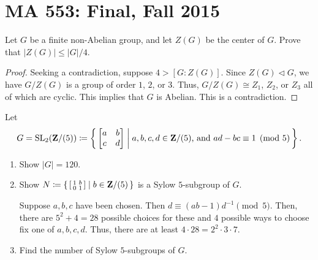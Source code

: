 \chapter{MA 553: Final, Fall 2015}
\begin{problem}
Let $G$ be a finite non-Abelian group, and let $Z(G)$ be the center of
$G$. Prove that $|Z(G)|\leq |G|/4$.
\end{problem}
\begin{proof}
Seeking a contradiction, suppose $4>[G:Z(G)]$. Since $Z(G)\lhd G$, we have
$G/Z(G)$ is a group of order $1$, $2$, or $3$. Thus, $G/Z(G)\cong Z_1$,
$Z_2$, or $Z_3$ all of which are cyclic. This implies that $G$ is
Abelian. This is a contradiction.
\end{proof}

\begin{problem}
Let
\[
G=\operatorname{SL}_2(\mathbf{Z}/(5))\coloneqq
\left\{\,\begin{bmatrix}a&b\\c&d\end{bmatrix}\;\middle|\;
\text{$a,b,c,d\in\mathbf{Z}/(5)$, and $ad-bc\equiv 1\pmod{5}$}\,\right\}.
\]
\begin{enumerate}[label=(\alph*)]
\item Show $|G|=120$.
\item Show
  $N\coloneqq\left\{\,\left[\begin{smallmatrix}1&b\\0&1\end{smallmatrix}\right]\;\middle|\;b\in\mathbf{Z}/(5)\,\right\}$
  is a Sylow $5$-subgroup of $G$.

Suppose $a,b,c$ have been chosen. Then $d\equiv
(ab-1)d^{-1}\pmod{5}$. Then, there are $5^2+4=28$ possible choices for
these and $4$ possible ways to choose fix one of $a,b,c,d$. Thus, there are
at least $4\cdot 28=2^2\cdot 3\cdot 7$.
\item Find the number of Sylow $5$-subgroups of $G$.
\end{enumerate}
\end{problem}
